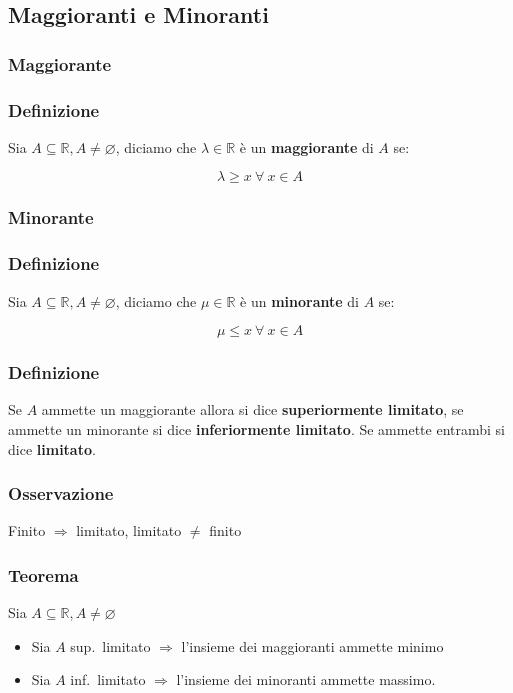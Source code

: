     \subsection{Maggioranti e Minoranti}
    \subsubsection{Maggiorante}
    \subsubsection*{Definizione}
    Sia $A \subseteq \mathbb{R}, A \neq \varnothing$, diciamo che $\lambda \in \mathbb{R}$ è un \textbf{maggiorante} di $A$ se:
    \begin{Large}
        \[
            \lambda \geq x\ \forall\ x \in A    
        \]
    \end{Large}
    \subsubsection{Minorante}
    \subsubsection*{Definizione}
    Sia $A \subseteq \mathbb{R}, A \neq \varnothing$, diciamo che $\mu \in \mathbb{R}$ è un \textbf{minorante} di $A$ se:
    \begin{Large}
        \[
            \mu \leq x\ \forall\ x \in A
        \]
    \end{Large}
    \subsubsection*{Definizione}
    Se $A$ ammette un maggiorante allora si dice \textbf{superiormente limitato}, se ammette un minorante
    si dice \textbf{inferiormente limitato}. Se ammette entrambi si dice \textbf{limitato}.

    \subsubsection*{Osservazione}
    Finito $\Rightarrow$ limitato, limitato $\neq$ finito
    \subsubsection*{Teorema}
    Sia $A \subseteq \mathbb{R}, A \neq \varnothing$
    \begin{itemize}
        \item Sia $A$ sup.\ limitato $\Rightarrow$ l'insieme dei maggioranti ammette minimo
        \item Sia $A$ inf.\ limitato $\Rightarrow$ l'insieme dei minoranti ammette massimo.
    \end{itemize}
